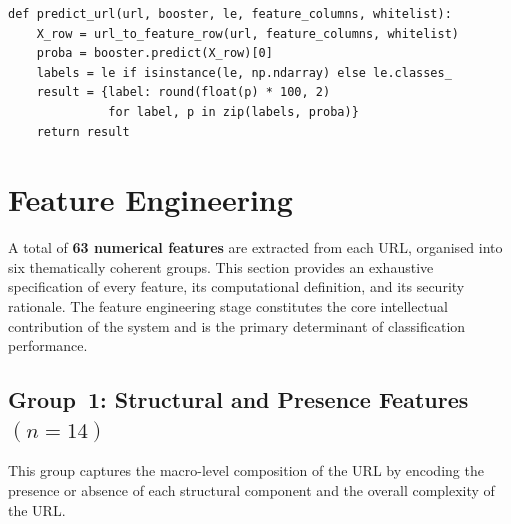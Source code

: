 \documentclass[a4paper,12pt]{article}
\begin{document}
\begin{lstlisting}[caption={Core inference logic}]
def predict_url(url, booster, le, feature_columns, whitelist):
    X_row = url_to_feature_row(url, feature_columns, whitelist)
    proba = booster.predict(X_row)[0]
    labels = le if isinstance(le, np.ndarray) else le.classes_
    result = {label: round(float(p) * 100, 2)
              for label, p in zip(labels, proba)}
    return result
\end{lstlisting}

\section{Feature Engineering}
\label{sec:features}

A total of \textbf{63 numerical features} are extracted from each URL, organised into six thematically coherent groups. This section provides an exhaustive specification of every feature, its computational definition, and its security rationale. The feature engineering stage constitutes the core intellectual contribution of the system and is the primary determinant of classification performance.

\subsection{Group~1: Structural and Presence Features \texorpdfstring{$(n=14)$}{(n=14)}}
\label{sec:feat_structural}

This group captures the macro-level composition of the URL by encoding the presence or absence of each structural component and the overall complexity of the URL.
\end{document}
